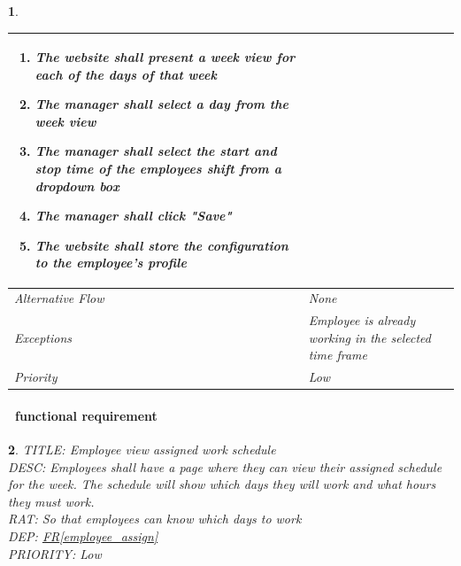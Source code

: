 \documentclass{scrreprt}
\theoremstyle{funreq}
\newtheorem{funreq}{}
\newcommand*{\reqref}[1]{\hyperref[#1]{FR\ref*{#1}}}
\begin{document}
\begin{funreq}
\begin{table}[H]
{\begin{tabularx}{\columnwidth}{|l|X|}
\begin{enumerate}
    					\item The website shall present a week view for each of the days of that week
    					\item The manager shall select a day from the week view
    					\item The manager shall select the start and stop time of the employees shift from a dropdown box
    					\item The manager shall click "Save"
    					\item The website shall store the configuration to the employee's profile
					\end{enumerate}
					\\ \hline Alternative Flow & 
					None
					\\ \hline Exceptions & 
					Employee is already working in the selected time frame
					\\ \hline Priority & 
					Low
					\\ \hline
				\end{tabularx}%
			}
		\end{table}
	\end{funreq}
	
	\paragraph[]{\Subsectionname ~functional requirement }
	\begin{funreq}
		\label{employee_viewwork}
		TITLE: Employee view assigned work schedule\\
		DESC: Employees shall have a page where they can view their assigned schedule for the week.  The schedule will show which days they will work and what hours they must work.\\
		RAT: So that employees can know which days to work\\
		DEP: \reqref{employee_assign}\\
		PRIORITY: Low\\
	\end{funreq}
	
\end{document}
